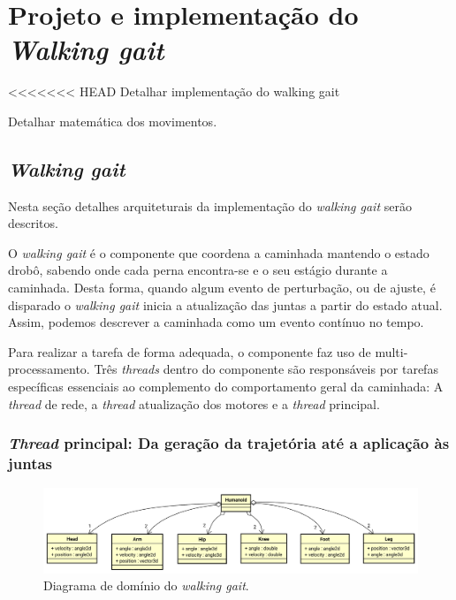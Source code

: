 \chapter{Projeto e implementação do \textit{Walking gait}}
\label{ch:Math}

\begin{guide}
<<<<<<< HEAD
	Detalhar implementação do walking gait
\end{guide}

\begin{guide}
	Detalhar matemática dos movimentos.
\end{guide}

\section{\textit{Walking gait}}

Nesta seção detalhes arquiteturais da implementação do \textit{walking gait} serão descritos.

O \textit{walking gait} é o componente que coordena a caminhada mantendo o estado drobô, sabendo onde cada perna encontra-se e o seu estágio durante a caminhada. Desta forma, quando algum evento de perturbação, ou de ajuste, é disparado o \textit{walking gait} inicia a atualização das juntas a partir do estado atual. Assim, podemos descrever a caminhada como um evento contínuo no tempo.

Para realizar a tarefa de forma adequada, o componente faz uso de multi-processamento. Três \textit{threads} dentro do componente são responsáveis por tarefas específicas essenciais ao complemento do comportamento geral da caminhada: A \textit{thread} de rede, a \textit{thread} atualização dos motores e a \textit{thread} principal.

\subsection{\textit{Thread} principal: Da geração da trajetória até a aplicação às juntas}

\begin{figure}[h!]
	\centering
	\includegraphics[scale=0.4]{imagens/svg/walkinggait-domain}
	\caption{Diagrama de domínio do \textit{walking gait}.}
	\label{fig:walkinggait:domain}
\end{figure}


